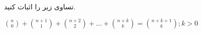 تساوی زیر را اثبات کنید. 
\\
\centerline{${n \choose 0} + {{n+1} \choose 1} + {{n+2} \choose 2} + ... + {{n+k} \choose k} = {{n+k+1} \choose k} ; k > 0$}\\